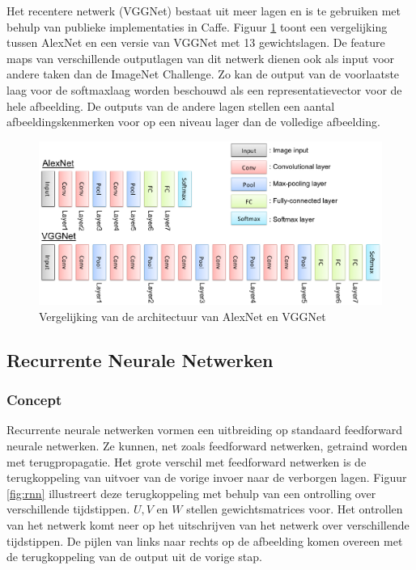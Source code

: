 Het recentere netwerk (VGGNet\cite{Arge2015}) bestaat uit meer lagen en is te gebruiken met behulp van publieke implementaties in Caffe\cite{Jia2014}.
Figuur \ref{fig:alexvgg} toont een vergelijking tussen AlexNet en een versie van VGGNet met 13 gewichtslagen. De feature maps van verschillende outputlagen van dit netwerk dienen ook als input voor andere taken dan de ImageNet Challenge. Zo kan de output van de voorlaatste laag voor de softmaxlaag worden beschouwd als een representatievector voor de hele afbeelding. De outputs van de andere lagen stellen een aantal afbeeldingskenmerken voor op een niveau lager dan de volledige afbeelding.

\begin{figure}[tb]
	\centering
	\includegraphics[width=\linewidth]{Images/alex_vgg.eps}
	\caption{Vergelijking van de architectuur van AlexNet en VGGNet}
	\label{fig:alexvgg}
\end{figure}

\subsection{Recurrente Neurale Netwerken}
\subsubsection{Concept}
Recurrente neurale netwerken vormen een uitbreiding op standaard feedforward neurale netwerken. Ze kunnen, net zoals feedforward netwerken, getraind worden met terugpropagatie. Het grote verschil met feedforward netwerken is de terugkoppeling van uitvoer van de vorige invoer naar de verborgen lagen. Figuur \ref{fig:rnn} illustreert deze terugkoppeling met behulp van een ontrolling over verschillende tijdstippen. $U,V$ en $W$ stellen gewichtsmatrices voor. Het ontrollen van het netwerk komt neer op het uitschrijven van het netwerk over verschillende tijdstippen. De pijlen van links naar rechts op de afbeelding komen overeen met de terugkoppeling van de output uit de vorige stap.

